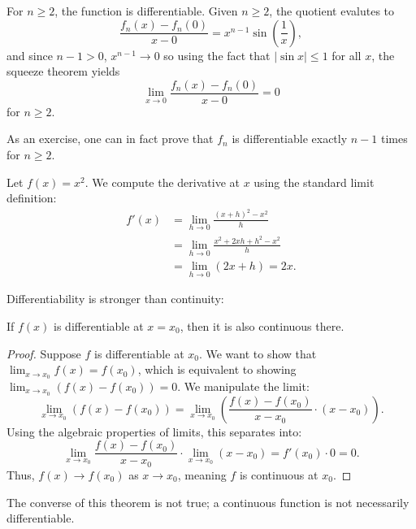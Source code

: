 \documentclass[../calculus.tex]{subfiles}
\begin{document}
For $n\ge 2$, the function is differentiable. Given $n\ge 2$, the quotient evalutes to
\[\frac{f_n(x)-f_n(0)}{x-0}=x^{n-1}\sin\left(\frac{1}{x}\right),\]
and since $n-1>0$, $x^{n-1}\to 0$ so using the fact that $|\sin x|\le 1$ for all $x$, the squeeze theorem yields
\[\lim_{x\to 0}\frac{f_n(x)-f_n(0)}{x-0}=0\]
for $n\ge 2$.

As an exercise, one can in fact prove that $f_n$ is differentiable exactly $n-1$ times for $n\ge 2$.

\begin{example}
    Let $f(x) = x^2$. We compute the derivative at $x$ using the standard limit definition:
    \begin{align*}
        f'(x) &= \lim_{h\to 0} \frac{(x+h)^2 - x^2}{h} \\
        &= \lim_{h\to 0} \frac{x^2 + 2xh + h^2 - x^2}{h} \\
        &= \lim_{h\to 0} (2x + h) = 2x.
    \end{align*}
\end{example}

Differentiability is stronger than continuity:

\begin{theorem}
    \begin{shaded*}
        If $f(x)$ is differentiable at $x=x_0$, then it is also continuous there.
    \end{shaded*}
\end{theorem}

\begin{proof}
    Suppose $f$ is differentiable at $x_0$. We want to show that $\lim_{x\to x_0} f(x) = f(x_0)$, which is equivalent to showing $\lim_{x\to x_0} (f(x) - f(x_0)) = 0$. We manipulate the limit:
    $$\lim_{x\to x_0} (f(x) - f(x_0)) = \lim_{x\to x_0} \left( \frac{f(x) - f(x_0)}{x - x_0} \cdot (x - x_0) \right).$$
    Using the algebraic properties of limits, this separates into:
    $$\lim_{x\to x_0} \frac{f(x) - f(x_0)}{x - x_0} \cdot \lim_{x\to x_0} (x - x_0) = f'(x_0) \cdot 0 = 0.$$
    Thus, $f(x) \to f(x_0)$ as $x \to x_0$, meaning $f$ is continuous at $x_0$.
\end{proof}

\begin{remark}
    The converse of this theorem is not true; a continuous function is not necessarily differentiable.
\end{remark}
\end{document}
